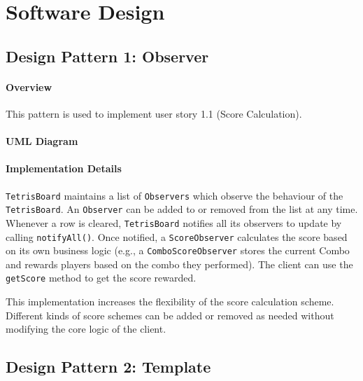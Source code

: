 \documentclass{article}
\begin{document}
\newpage

\section{Software Design}

\subsection{Design Pattern 1: Observer}

\paragraph{Overview}
This pattern is used to implement user story 1.1 (Score Calculation).

\paragraph{UML Diagram}\hfill

\begin{figure}[H]
    
\end{figure}

\paragraph{Implementation Details}

\verb`TetrisBoard` maintains a list of \verb`Observers` which observe the behaviour of the \verb`TetrisBoard`. An \verb`Observer` can be added to or removed from the list at any time. Whenever a row is cleared, \verb`TetrisBoard` notifies all its observers to update by calling \verb`notifyAll()`. Once notified, a \verb`ScoreObserver` calculates the score based on its own business logic (e.g., a \verb`ComboScoreObserver` stores the current Combo and rewards players based on the combo they performed). The client can use the \verb`getScore` method to get the score rewarded.

This implementation increases the flexibility of the score calculation scheme. Different kinds of score schemes can be added or removed as needed without modifying the core logic of the client.

\clearpage

\subsection{Design Pattern 2: Template}
\end{document}
